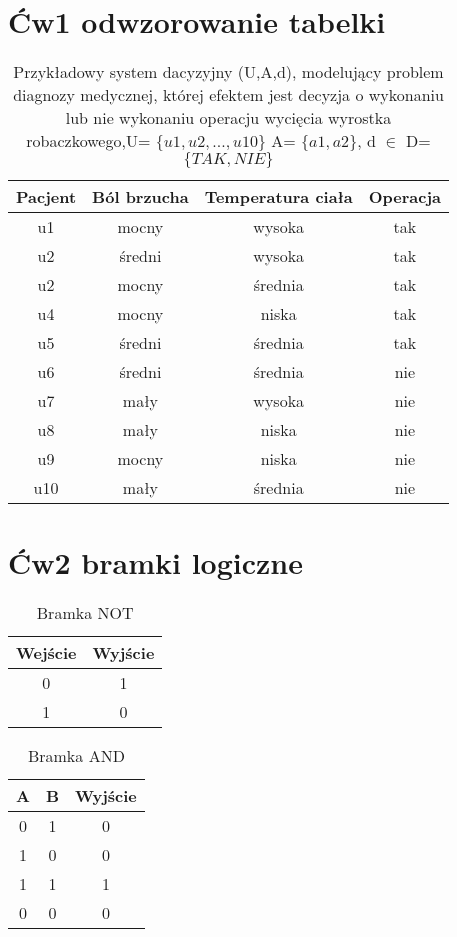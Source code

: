 \documentclass[11pt,a4paper]{article}
\begin{document}
\section*{Ćw1 odwzorowanie tabelki}
\begin{table}[h]
\centering\caption{Przykładowy system dacyzyjny (U,A,d), modelujący problem diagnozy medycznej, której \newline efektem jest decyzja o wykonaniu lub nie wykonaniu operacju wycięcia wyrostka robaczkowego,\newline U= $\{u1,u2,...,u10\}$ A= $\{a1,a2\}$, d $\in$ D=$\{TAK,NIE\}$}
\begin{tabular}{c|c c c}
\hline
\hline
Pacjent & Ból brzucha & Temperatura ciała & Operacja\\
\hline	
u1 & mocny  & wysoka  & tak\\
u2 & średni & wysoka  & tak\\
u2 & mocny  & średnia & tak\\
u4 & mocny  & niska   & tak\\
u5 & średni & średnia & tak\\
u6 & średni & średnia & nie\\
u7 & mały   & wysoka  & nie\\
u8 & mały   & niska   & nie\\
u9 & mocny  & niska   & nie\\
u10 & mały  & średnia & nie\\
\hline
\hline
\end{tabular}	
\end{table}

\section*{Ćw2 bramki logiczne}

\begin{table}[h]
\centering\caption*{Bramka NOT}
\begin{tabular}{|c|c|}
\hline
Wejście & Wyjście \\
\hline
0 & 1\\
\hline
1 & 0\\
\hline
\end{tabular}	
\end{table}

\begin{table}[h]
\centering\caption*{Bramka AND}
\begin{tabular}{|c|c|c|}
\hline
A & B & Wyjście\\
\hline
0 & 1 & 0\\
\hline
1 & 0 & 0\\
\hline
1 & 1 & 1\\
\hline
0 & 0 & 0\\
\hline
\end{tabular}	
\end{table}
\end{document}
